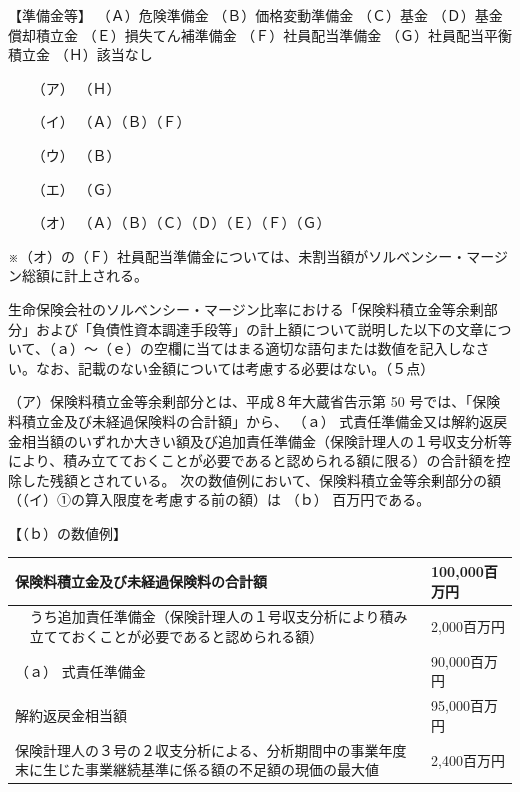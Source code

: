 \documentclass[report,gutter=10mm,fore-edge=10mm,uplatex,dvipdfmx]{jlreq}
\begin{document}
【準備金等】
（Ａ）危険準備金 （Ｂ）価格変動準備金 （Ｃ）基金
（Ｄ）基金償却積立金 （Ｅ）損失てん補準備金 （Ｆ）社員配当準備金
（Ｇ）社員配当平衡積立金 （Ｈ）該当なし

\answer{}
\begin{itemize}
 \item[（ア） ] （Ｈ） 
 \item[（イ） ] （Ａ）（Ｂ）（Ｆ）
 \item[（ウ） ] （Ｂ） 
 \item[（エ） ] （Ｇ）
 \item[（オ） ] （Ａ）（Ｂ）（Ｃ）（Ｄ）（Ｅ）（Ｆ）（Ｇ）
\end{itemize}

※（オ）の（Ｆ）社員配当準備金については、未割当額がソルベンシー・マージン総額に計上される。


生命保険会社のソルベンシー・マージン比率における「保険料積立金等余剰部分」および「負債性資本調達手段等」の計上額について説明した以下の文章について、（ａ）～（ｅ）の空欄に当てはまる適切な語句または数値を記入しなさい。なお、記載のない金額については考慮する必要はない。（５点）

（ア）保険料積立金等余剰部分とは、平成８年大蔵省告示第 50 号では、「保険料積立金及び未経過保険料の合計額」から、 （ａ） 式責任準備金又は解約返戻金相当額のいずれか大きい額及び追加責任準備金（保険計理人の１号収支分析等により、積み立てておくことが必要であると認められる額に限る）の合計額を控除した残額とされている。
次の数値例において、保険料積立金等余剰部分の額（（イ）①の算入限度を考慮する前の額）は （ｂ） 百万円である。

【（ｂ）の数値例】

\begin{tabularx}{\textwidth}{|X|X|X|}
\hline
 \multicolumn{2}{|X|}{保険料積立金及び未経過保険料の合計額}& 100,000百万円\\ \hline
 & うち追加責任準備金（保険計理人の１号収支分析により積み立てておくことが必要であると認められる額）& 2,000百万円\\ \cline{2-3}
 \multicolumn{2}{|X|}{（ａ） 式責任準備金} & 90,000百万円\\ \hline
 \multicolumn{2}{|X|}{ 解約返戻金相当額 } & 95,000百万円\\ \hline
 \multicolumn{2}{|X|}{ 保険計理人の３号の２収支分析による、分析期間中の事業年度末に生じた事業継続基準に係る額の不足額の現価の最大値 } & 2,400百万円\\ \hline
\end{tabularx}
\end{document}
